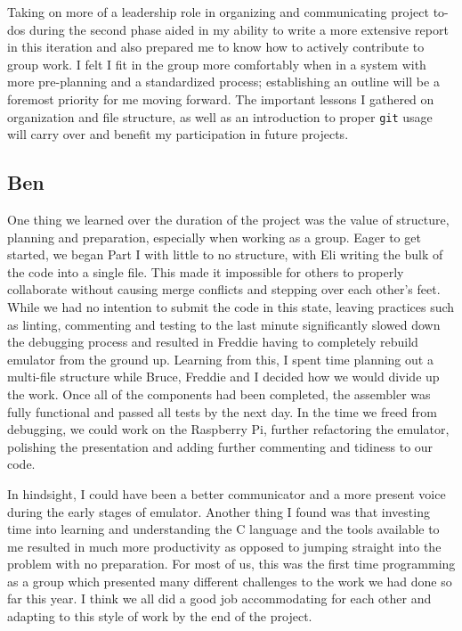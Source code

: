 \documentclass[11pt]{article}
\begin{document}
Taking on more of a leadership role in organizing and communicating project to-dos during the 
second phase aided in my ability to write a more extensive report in this iteration and also 
prepared me to know how to actively contribute to group work. I felt I fit in the group more 
comfortably when in a system with more pre-planning and a standardized process; establishing an 
outline will be a foremost priority for me moving forward. The important lessons I gathered on 
organization and file structure, as well as an introduction to proper \verb|git| usage will 
carry over and benefit my participation in future projects.

\subsection{Ben}

One thing we learned over the duration of the project was the value of structure, planning and 
preparation, especially when working as a group. Eager to get started, we began Part I with 
little to no structure, with Eli writing the bulk of the code into a single file. This made it 
impossible for others to properly collaborate without causing merge conflicts and stepping over 
each other's feet. While we had no intention to submit the code in this state, leaving 
practices such as linting, commenting and testing to the last minute significantly slowed down 
the debugging process and resulted in Freddie having to completely rebuild emulator from the 
ground up. Learning from this, I spent time planning out a multi-file structure while Bruce, 
Freddie and I decided how we would divide up the work. Once all of the components had been 
completed, the assembler was fully functional and passed all tests by the next day. In the time 
we freed from debugging, we could work on the Raspberry Pi, further refactoring the emulator, 
polishing the presentation and adding further commenting and tidiness to our code.

In hindsight, I could have been a better communicator and a more present voice during the early 
stages of emulator. Another thing I found was that investing time into learning and 
understanding the C language and the tools available to me resulted in much more productivity 
as opposed to jumping straight into the problem with no preparation. For most of us, this was 
the first time programming as a group which presented many different challenges to the work we 
had done so far this year. I think we all did a good job accommodating for each other and 
adapting to this style of work by the end of the project.
\end{document}
